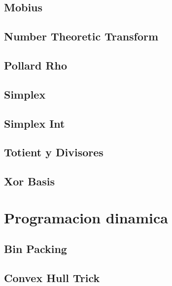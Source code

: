 \subsection{Mobius}
\raggedbottom
\hrulefill
\subsection{Number Theoretic Transform}
\raggedbottom
\hrulefill
\subsection{Pollard	Rho}
\raggedbottom
\hrulefill
\subsection{Simplex}
\raggedbottom
\hrulefill
\subsection{Simplex Int}
\raggedbottom
\hrulefill
\subsection{Totient y Divisores}
\raggedbottom
\hrulefill
\subsection{Xor Basis}
\raggedbottom
\hrulefill

\section{Programacion dinamica}
\subsection{Bin Packing}
\raggedbottom
\hrulefill
\subsection{Convex Hull Trick}
\raggedbottom
\hrulefill
